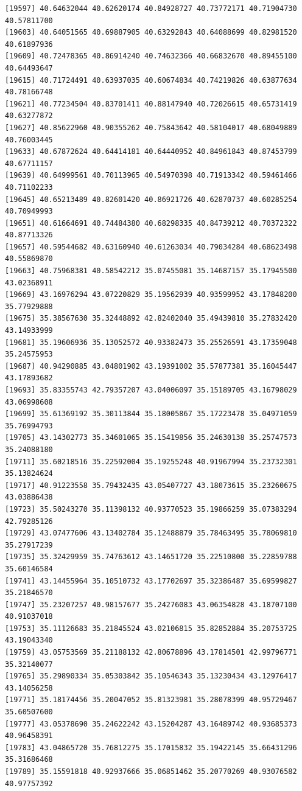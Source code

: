 \documentclass[
  letterpaper,
  DIV=11,
  numbers=noendperiod]{scrartcl}
\begin{document}
\begin{verbatim}
[19597] 40.64632044 40.62620174 40.84928727 40.73772171 40.71904730 40.57811700
[19603] 40.64051565 40.69887905 40.63292843 40.64088699 40.82981520 40.61897936
[19609] 40.72478365 40.86914240 40.74632366 40.66832670 40.89455100 40.64493647
[19615] 40.71724491 40.63937035 40.60674834 40.74219826 40.63877634 40.78166748
[19621] 40.77234504 40.83701411 40.88147940 40.72026615 40.65731419 40.63277872
[19627] 40.85622960 40.90355262 40.75843642 40.58104017 40.68049889 40.76003445
[19633] 40.67872624 40.64414181 40.64440952 40.84961843 40.87453799 40.67711157
[19639] 40.64999561 40.70113965 40.54970398 40.71913342 40.59461466 40.71102233
[19645] 40.65213489 40.82601420 40.86921726 40.62870737 40.60285254 40.70949993
[19651] 40.61664691 40.74484380 40.68298335 40.84739212 40.70372322 40.87713326
[19657] 40.59544682 40.63160940 40.61263034 40.79034284 40.68623498 40.55869870
[19663] 40.75968381 40.58542212 35.07455081 35.14687157 35.17945500 43.02368911
[19669] 43.16976294 43.07220829 35.19562939 40.93599952 43.17848200 35.77929888
[19675] 35.38567630 35.32448892 42.82402040 35.49439810 35.27832420 43.14933999
[19681] 35.19606936 35.13052572 40.93382473 35.25526591 43.17359048 35.24575953
[19687] 40.94290885 43.04801902 43.19391002 35.57877381 35.16045447 43.17893682
[19693] 35.83355743 42.79357207 43.04006097 35.15189705 43.16798029 43.06998608
[19699] 35.61369192 35.30113844 35.18005867 35.17223478 35.04971059 35.76994793
[19705] 43.14302773 35.34601065 35.15419856 35.24630138 35.25747573 35.24088180
[19711] 35.60218516 35.22592004 35.19255248 40.91967994 35.23732301 35.13824624
[19717] 40.91223558 35.79432435 43.05407727 43.18073615 35.23260675 43.03886438
[19723] 35.50243270 35.11398132 40.93770523 35.19866259 35.07383294 42.79285126
[19729] 43.07477606 43.13402784 35.12488879 35.78463495 35.78069810 35.27917239
[19735] 35.32429959 35.74763612 43.14651720 35.22510800 35.22859788 35.60146584
[19741] 43.14455964 35.10510732 43.17702697 35.32386487 35.69599827 35.21846570
[19747] 35.23207257 40.98157677 35.24276083 43.06354828 43.18707100 40.91037018
[19753] 35.11126683 35.21845524 43.02106815 35.82852884 35.20753725 43.19043340
[19759] 43.05753569 35.21188132 42.80678896 43.17814501 42.99796771 35.32140077
[19765] 35.29890334 35.05303842 35.10546343 35.13230434 43.12976417 43.14056258
[19771] 35.18174456 35.20047052 35.81323981 35.28078399 40.95729467 35.60507600
[19777] 43.05378690 35.24622242 43.15204287 43.16489742 40.93685373 40.96458391
[19783] 43.04865720 35.76812275 35.17015832 35.19422145 35.66431296 35.31686468
[19789] 35.15591818 40.92937666 35.06851462 35.20770269 40.93076582 40.97757392

\end{verbatim}
\end{document}
